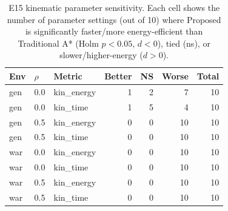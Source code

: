 \begin{table}[htbp]
\centering\small
\caption{E15 kinematic parameter sensitivity. Each cell shows the number of parameter settings (out of 10) where Proposed is significantly faster/more energy-efficient than Traditional A* (Holm $p<0.05$, $d<0$), tied (ns), or slower/higher-energy ($d>0$).}\label{tab:kin_sens}
\begin{tabular}{lllrrrr}
\toprule
Env & $\rho$ & Metric & Better & NS & Worse & Total \\
\midrule
gen & 0.0 & kin\_energy & 1 & 2 & 7 & 10 \\
gen & 0.0 & kin\_time & 1 & 5 & 4 & 10 \\
gen & 0.5 & kin\_energy & 0 & 0 & 10 & 10 \\
gen & 0.5 & kin\_time & 0 & 0 & 10 & 10 \\
war & 0.0 & kin\_energy & 0 & 0 & 10 & 10 \\
war & 0.0 & kin\_time & 0 & 0 & 10 & 10 \\
war & 0.5 & kin\_energy & 0 & 0 & 10 & 10 \\
war & 0.5 & kin\_time & 0 & 0 & 10 & 10 \\
\bottomrule
\end{tabular}
\end{table}
